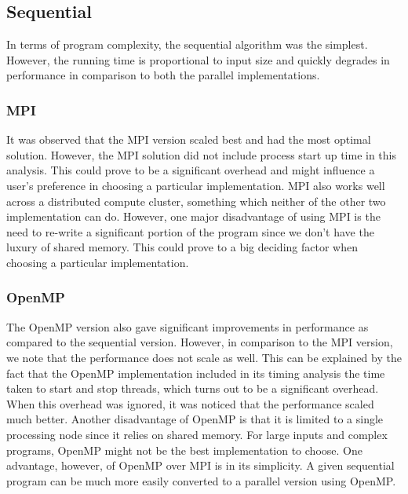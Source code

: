 \documentclass[11pt]{article}
\begin{document}
\subsection{Sequential}

In terms of program complexity, the sequential algorithm was the simplest. However, the running time is proportional to input size and quickly degrades in performance in comparison to both the parallel implementations.

\subsubsection{MPI}

It was observed that the MPI version scaled best and had the most optimal solution. However, the MPI solution did not include process start up time in this analysis. This could prove to be a significant overhead and might influence a user's preference in choosing a particular implementation. MPI also works well across a distributed compute cluster, something which neither of the other two implementation can do. However, one major disadvantage of using MPI is the need to re-write a significant portion of the program since we don't have the luxury of shared memory. This could prove to a big deciding factor when choosing a particular implementation. 

\subsubsection{OpenMP}

The OpenMP version also gave significant improvements in performance as compared to the sequential version. However, in comparison to the MPI version, we note that the performance does not scale as well. This can be explained by the fact that the OpenMP implementation included in its timing analysis the time taken to start and stop threads, which turns out to be a significant overhead. When this overhead was ignored, it was noticed that the performance scaled much better. Another disadvantage of OpenMP is that it is limited to a single processing node since it relies on shared memory. For large inputs and complex programs, OpenMP might not be the best implementation to choose. One advantage, however, of OpenMP over MPI is in its simplicity. A given sequential program can be much more easily converted to a parallel version using OpenMP. 
\end{document}
